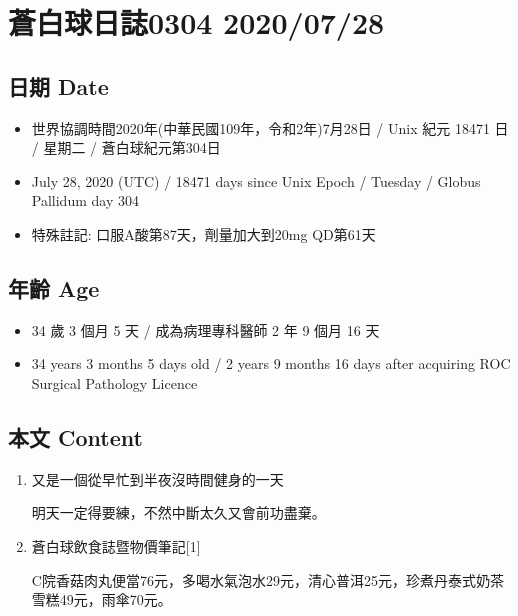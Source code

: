 \documentclass[a5paper, 11pt
]{book}
\providecommand{\tightlist}{%
  \setlength{\itemsep}{0pt}\setlength{\parskip}{0pt}}
\begin{document}
\hypertarget{ux84bcux767dux7403ux65e5ux8a8c0304-20200728}{%
\section{蒼白球日誌0304
2020/07/28}\label{ux84bcux767dux7403ux65e5ux8a8c0304-20200728}}

\hypertarget{ux65e5ux671f-date-57}{%
\subsection{日期 Date}\label{ux65e5ux671f-date-57}}

\begin{itemize}
\tightlist
\item
  世界協調時間2020年(中華民國109年，令和2年)7月28日 / Unix 紀元 18471 日
  / 星期二 / 蒼白球紀元第304日
\item
  July 28, 2020 (UTC) / 18471 days since Unix Epoch / Tuesday / Globus
  Pallidum day 304
\item
  特殊註記: 口服A酸第87天，劑量加大到20mg QD第61天
\end{itemize}

\hypertarget{ux5e74ux9f61-age-57}{%
\subsection{年齡 Age}\label{ux5e74ux9f61-age-57}}

\begin{itemize}
\tightlist
\item
  34 歲 3 個月 5 天 / 成為病理專科醫師 2 年 9 個月 16 天
\item
  34 years 3 months 5 days old / 2 years 9 months 16 days after
  acquiring ROC Surgical Pathology Licence
\end{itemize}

\hypertarget{ux672cux6587-content-57}{%
\subsection{本文 Content}\label{ux672cux6587-content-57}}

\begin{enumerate}
\def\labelenumi{\arabic{enumi}.}
\item
  又是一個從早忙到半夜沒時間健身的一天

  明天一定得要練，不然中斷太久又會前功盡棄。
\item
  蒼白球飲食誌暨物價筆記{[}1{]}

  C院香菇肉丸便當76元，多喝水氣泡水29元，清心普洱25元，珍煮丹泰式奶茶雪糕49元，雨傘70元。
\end{enumerate}
\end{document}
